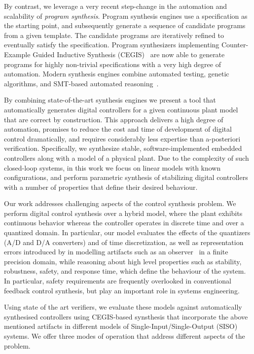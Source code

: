 \documentclass[twocolumn]{autart}    %
\begin{document}
By contrast, we leverage a very recent step-change in the automation and
scalability of \emph{program synthesis}.  Program synthesis engines use a
specification as the starting point, and subsequently generate a sequence of
candidate programs from a given template.  The candidate programs are
iteratively refined to eventually satisfy the specification.  Program
synthesizers implementing Counter-Example Guided Inductive Synthesis
(CEGIS)~\cite{DBLP:conf/asplos/Solar-LezamaTBSS06} are now able to generate
programs for highly non-trivial specifications with a very high degree of
automation.  Modern synthesis engines combine automated testing, genetic
algorithms, and SMT-based automated
reasoning~\cite{DBLP:journals/corr/AlurFSS16a, DBLP:conf/lpar/DavidKL15}.

By combining state-of-the-art synthesis engines we present a tool that
automatically generates digital controllers for a given continuous plant
model that are correct by construction.  This approach delivers a high
degree of automation, promises to reduce the cost and time of development of
digital control dramatically, and requires considerably less expertise than
a-posteriori verification.  Specifically, we synthesize stable,
software-implemented embedded controllers along with a model of a physical
plant.  Due to the complexity of such closed-loop systems, in this work we
focus on linear models with known configurations, and perform parametric
synthesis of stabilizing digital controllers with a number of properties that
define their desired behaviour.

Our work addresses challenging aspects of the control synthesis problem.  We
perform digital control synthesis over a hybrid model, where the plant
exhibits continuous behavior whereas the controller operates in discrete
time and over a quantized domain.  In particular, our model evaluates the
effects of the quantizers (A/D and D/A converters) and of time
discretization, as well as representation errors introduced by in modelling
artifacts such as an observer~\cite{astrom1997computer} in a finite
precision domain, while reasoning about high level properties such as
stability, robustness, safety, and response time, which define the behaviour
of the system.  In particular, safety requirements are frequently overlooked
in conventional feedback control synthesis, but play an important role in
systems engineering.

Using state of the art verifiers, we evaluate these models against
automatically synthesised controllers using CEGIS-based synsthesis that
incorporate the above mentioned artifacts in different models of
Single-Input/Single-Output (SISO) systems.  We offer three modes of
operation that address different aspects of the problem.
\end{document}
